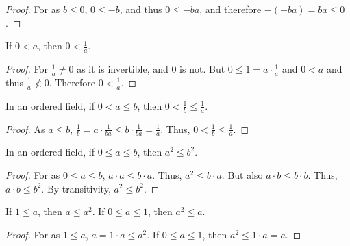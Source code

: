 \documentclass[crop=false,class=book]{standalone}
\begin{document}
\begin{proof}
For as $b\leq 0$, $0\leq -b$, and thus $0\leq -ba$, and therefore $-(-ba) = ba \leq 0$.
\end{proof}
\begin{theorem}
If $0< a$, then $0<\frac{1}{a}$.
\end{theorem}
\begin{proof}
For $\frac{1}{a}\ne 0$ as it is invertible, and $0$ is not. But $0\leq1=a\cdot \frac{1}{a}$ and $0<a$ and thus $\frac{1}{a} \not <0$. Therefore $0<\frac{1}{a}$.
\end{proof}
\begin{theorem}
In an ordered field, if $0<a\leq b$, then $0<\frac{1}{b}\leq\frac{1}{a}$.
\end{theorem}
\begin{proof}
As $a\leq b$, $\frac{1}{b}=a\cdot \frac{1}{ba} \leq b\cdot \frac{1}{ba}=\frac{1}{a}$. Thus, $0< \frac{1}{b}\leq \frac{1}{a}$.
\end{proof}
\begin{theorem}
In an ordered field, if $0 \leq a \leq b$, then $a^2 \leq b^2$.
\end{theorem}
\begin{proof}
For as $0\leq a \leq b$, $a\cdot a \leq b\cdot a$. Thus, $a^2 \leq b \cdot a$. But also $a\cdot b \leq b\cdot b$. Thus, $a\cdot b \leq b^2$. By transitivity, $a^2 \leq b^2$.
\end{proof}
\begin{corollary}
If $1\leq a$, then $a \leq a^2$. If $0\leq a \leq 1$, then $a^2 \leq a$.
\end{corollary}
\begin{proof}
For as $1\leq a$, $a=1\cdot a \leq a^2$. If $0\leq a \leq 1$, then $a^2 \leq 1\cdot a = a$.
\end{proof}
\end{document}
